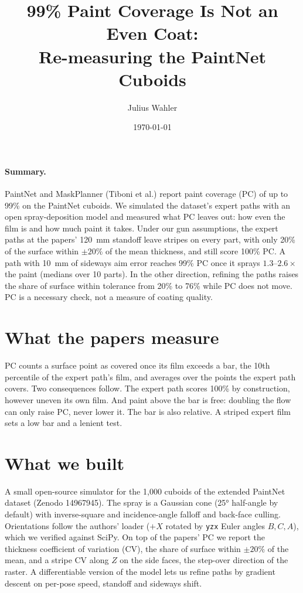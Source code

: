 \documentclass[10pt]{article}
\title{\vspace{-1.5em}99\% Paint Coverage Is Not an Even Coat:\\Re-measuring the PaintNet Cuboids}
\author{Julius Wahler}
\date{\today}
\begin{document}
\maketitle
\vspace{-1.5em}

\paragraph{Summary.}
PaintNet and MaskPlanner (Tiboni et al.) report paint coverage (PC) of up to 99\% on the
PaintNet cuboids. We simulated the dataset's expert paths with an open spray-deposition
model and measured what PC leaves out: how even the film is and how much paint it takes.
Under our gun assumptions, the expert paths at the papers' \SI{120}{mm} standoff leave
stripes on every part, with only 20\% of the surface within $\pm20\%$ of the mean
thickness, and still score 100\% PC. A path with \SI{10}{mm} of sideways aim error reaches
99\% PC once it sprays $1.3$--$2.6\times$ the paint (medians over 10 parts). In the other direction, refining the
paths raises the share of surface within tolerance from 20\% to 76\% while PC does not move.
PC is a necessary check, not a measure of coating quality.

\section*{What the papers measure}
PC counts a surface point as covered once its film exceeds a bar, the 10th percentile of
the expert path's film, and averages over the points the expert path covers. Two
consequences follow. The expert path scores 100\% by construction, however uneven its own
film. And paint above the bar is free: doubling the flow can only raise PC, never lower it.
The bar is also relative. A striped expert film sets a low bar and a lenient test.

\section*{What we built}
A small open-source simulator for the 1{,}000 cuboids of the extended PaintNet dataset
(Zenodo 14967945). The spray is a Gaussian cone (\ang{25} half-angle by default) with
inverse-square and incidence-angle falloff and back-face culling. Orientations follow the
authors' loader ($+X$ rotated by \texttt{yzx} Euler angles $B,C,A$), which we verified
against SciPy. On top of the papers' PC we report the thickness coefficient of variation
(CV), the share of surface within $\pm20\%$ of the mean, and a stripe CV along $Z$ on the
side faces, the step-over direction of the raster. A differentiable version of the model
lets us refine paths by gradient descent on per-pose speed, standoff and sideways shift.
\end{document}
